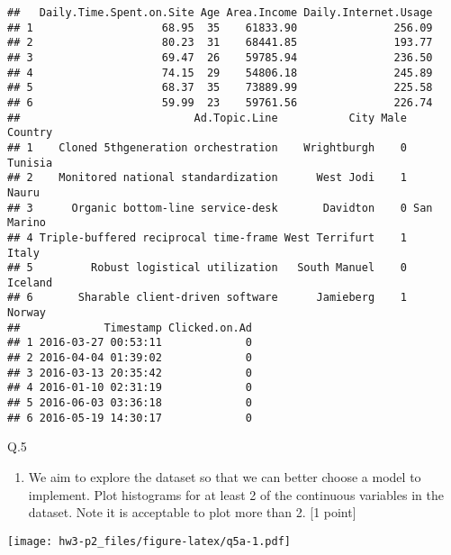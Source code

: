 \documentclass[
]{article}
\newenvironment{Shaded}{\begin{snugshade}}{\end{snugshade}}
\newcommand{\KeywordTok}[1]{\textcolor[rgb]{0.13,0.29,0.53}{\textbf{#1}}}
\newcommand{\NormalTok}[1]{#1}
\newcommand{\OperatorTok}[1]{\textcolor[rgb]{0.81,0.36,0.00}{\textbf{#1}}}
\newcommand{\StringTok}[1]{\textcolor[rgb]{0.31,0.60,0.02}{#1}}
\providecommand{\tightlist}{%
  \setlength{\itemsep}{0pt}\setlength{\parskip}{0pt}}
\begin{document}
\begin{verbatim}
##   Daily.Time.Spent.on.Site Age Area.Income Daily.Internet.Usage
## 1                    68.95  35    61833.90               256.09
## 2                    80.23  31    68441.85               193.77
## 3                    69.47  26    59785.94               236.50
## 4                    74.15  29    54806.18               245.89
## 5                    68.37  35    73889.99               225.58
## 6                    59.99  23    59761.56               226.74
##                           Ad.Topic.Line           City Male    Country
## 1    Cloned 5thgeneration orchestration    Wrightburgh    0    Tunisia
## 2    Monitored national standardization      West Jodi    1      Nauru
## 3      Organic bottom-line service-desk       Davidton    0 San Marino
## 4 Triple-buffered reciprocal time-frame West Terrifurt    1      Italy
## 5         Robust logistical utilization   South Manuel    0    Iceland
## 6       Sharable client-driven software      Jamieberg    1     Norway
##             Timestamp Clicked.on.Ad
## 1 2016-03-27 00:53:11             0
## 2 2016-04-04 01:39:02             0
## 3 2016-03-13 20:35:42             0
## 4 2016-01-10 02:31:19             0
## 5 2016-06-03 03:36:18             0
## 6 2016-05-19 14:30:17             0
\end{verbatim}

Q.5

\begin{enumerate}
\def\labelenumi{\alph{enumi})}
\tightlist
\item
  We aim to explore the dataset so that we can better choose a model to
  implement. Plot histograms for at least 2 of the continuous variables
  in the dataset. Note it is acceptable to plot more than 2. {[}1
  point{]}
\end{enumerate}

\begin{Shaded}
\end{Shaded}

\texttt{[image: hw3-p2\_files/figure-latex/q5a-1.pdf]}

\begin{Shaded}
\end{Shaded}
\end{document}
